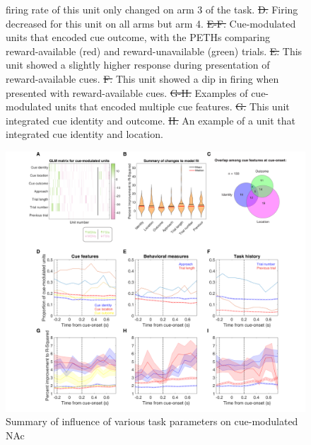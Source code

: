 \documentclass[11pt]{article}
\newcommand{\bsf}[1]{\textbf{#1}}
\providecommand{\DIFadd}[1]{{\protect\color{blue}\uwave{#1}}} %
\providecommand{\DIFdel}[1]{{\protect\color{red}\sout{#1}}}                      %
\providecommand{\DIFaddFL}[1]{\DIFadd{#1}} %
\providecommand{\DIFdelFL}[1]{\DIFdel{#1}} %
\providecommand{\DIFaddbeginFL}{} %
\providecommand{\DIFaddendFL}{} %
\providecommand{\DIFdelbeginFL}{} %
\providecommand{\DIFdelendFL}{} %
\newcommand{\DIFscaledelfig}{0.5}
\newlength{\DIFdelgraphicswidth} %
\newlength{\DIFdelgraphicsheight} %
\newcommand{\DIFaddincludegraphics}[2][]{{\color{blue}\fbox{\DIFOincludegraphics[#1]{#2}}}} %
\newcommand{\DIFdelincludegraphics}[2][]{%
\sbox{\DIFdelgraphicsbox}{\DIFOincludegraphics[#1]{#2}}%
\settoboxwidth{\DIFdelgraphicswidth}{\DIFdelgraphicsbox} %
\settoboxtotalheight{\DIFdelgraphicsheight}{\DIFdelgraphicsbox} %
\scalebox{\DIFscaledelfig}{%
\parbox[b]{\DIFdelgraphicswidth}{\usebox{\DIFdelgraphicsbox}\\[-\baselineskip] \rule{\DIFdelgraphicswidth}{0em}}\llap{\resizebox{\DIFdelgraphicswidth}{\DIFdelgraphicsheight}{%
\setlength{\unitlength}{\DIFdelgraphicswidth}%
\begin{picture}(1,1)%
\thicklines\linethickness{2pt} %
{\color[rgb]{1,0,0}\put(0,0){\framebox(1,1){}}}%
{\color[rgb]{1,0,0}\put(0,0){\line( 1,1){1}}}%
{\color[rgb]{1,0,0}\put(0,1){\line(1,-1){1}}}%
\end{picture}%
}\hspace*{3pt}}} %
} %
\DeclareRobustCommand{\DIFaddbeginFL}{\DIFOaddbeginFL \let\includegraphics\DIFaddincludegraphics} %
\DeclareRobustCommand{\DIFaddendFL}{\DIFOaddendFL \let\includegraphics\DIFOincludegraphics} %
\DeclareRobustCommand{\DIFdelbeginFL}{\DIFOdelbeginFL \let\includegraphics\DIFdelincludegraphics} %
\DeclareRobustCommand{\DIFdelendFL}{\DIFOaddendFL \let\includegraphics\DIFOincludegraphics} %
\begin{document}
{\begin{figure}[h]
{{  }\DIFaddendFL firing rate of this unit only changed on arm 3 of the task. \DIFdelbeginFL \DIFdelFL{D. }\DIFdelendFL \DIFaddbeginFL \DIFaddFL{\bsf{D}: }\DIFaddendFL Firing
  decreased for this unit on all arms but arm 4. \DIFdelbeginFL \DIFdelFL{E-F. }\DIFdelendFL \DIFaddbeginFL \DIFaddFL{\bsf{E-F}: }\DIFaddendFL Cue-modulated units
  that encoded cue outcome, with the PETHs comparing reward-available (red) and
  reward-unavailable (green) trials. \DIFdelbeginFL \DIFdelFL{E. }\DIFdelendFL \DIFaddbeginFL \DIFaddFL{\bsf{E}: }\DIFaddendFL This unit showed a slightly higher
  response during presentation of reward-available cues. \DIFdelbeginFL \DIFdelFL{F. }\DIFdelendFL \DIFaddbeginFL \DIFaddFL{\bsf{F}: }\DIFaddendFL This unit
  showed a dip in firing when presented with reward-available cues. \DIFdelbeginFL \DIFdelFL{G-H. }\DIFdelendFL \DIFaddbeginFL \DIFaddFL{\bsf{G-H}:
  }\DIFaddendFL Examples of cue-modulated units that encoded multiple cue features. \DIFdelbeginFL \DIFdelFL{G. }\DIFdelendFL \DIFaddbeginFL \DIFaddFL{\bsf{G}:
  }\DIFaddendFL This unit integrated cue identity and outcome. \DIFdelbeginFL \DIFdelFL{H. }\DIFdelendFL \DIFaddbeginFL \DIFaddFL{\bsf{H}: }\DIFaddendFL An example of a unit
  that integrated cue identity and location.}
\label{fig:examples}
\end{figure}
\begin{figure}[h]
\centering
\includegraphics[width=\textwidth]{Fig 6 - GLM.png}
\caption{Summary of influence of various task parameters on cue-modulated NAc
}
\end{figure}}
\end{document}
